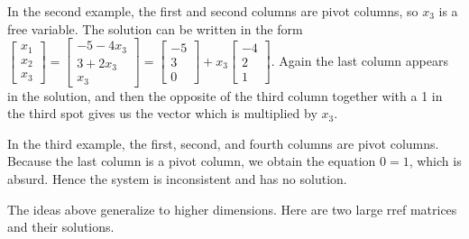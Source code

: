 \documentclass[10pt]{article}
\begin{document}
In the second example, the first and second columns are pivot columns, so $x_3$ is a free variable.  The solution can be written in the form 
$\begin{bmatrix}x_1\\x_2\\x_3\end{bmatrix} = \begin{bmatrix}-5-4x_3\\3+2x_3\\x_3\end{bmatrix} = \begin{bmatrix}-5\\3\\0\end{bmatrix} + x_3 \begin{bmatrix}-4\\2\\1\end{bmatrix}$. Again the last column appears in the solution, and then the opposite of the third column together with a 1 in the third spot gives us the vector which is multiplied by $x_3$. 

In the third example, the first, second, and fourth columns are pivot columns. Because the last column is a pivot column, we obtain the equation $0=1$, which is absurd.  Hence the system is inconsistent and has no solution.

The ideas above generalize to higher dimensions. Here are two large rref matrices and their solutions.
\end{document}
